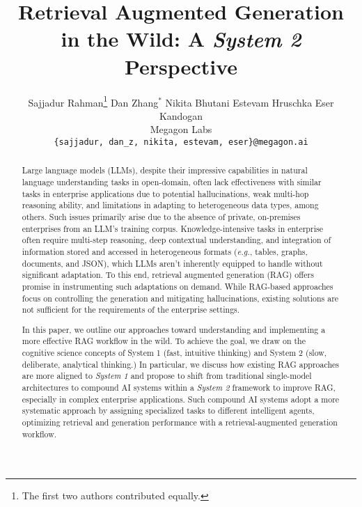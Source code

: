 \documentclass[11pt,dvipsnames]{article}
\newcommand{\eg}{{\itshape e.g.}, }
\begin{document}
\title{Retrieval Augmented Generation in the Wild: A \emph{System 2} Perspective}

\author{Sajjadur Rahman\footnote{The first two authors contributed equally.} \quad Dan Zhang$^*$ \quad Nikita Bhutani \quad Estevam Hruschka \quad Eser Kandogan\\
Megagon Labs\\
\texttt{\{sajjadur, dan\_z, nikita, estevam, eser\}@megagon.ai}
}

\maketitle

\begin{abstract}
Large language models (LLMs), despite their impressive capabilities in natural language understanding tasks in open-domain, often lack effectiveness with similar tasks in enterprise applications due to potential hallucinations, weak multi-hop reasoning ability, and limitations in adapting to heterogeneous data types, among others. Such issues primarily arise due to the absence of private, on-premises enterprises from an LLM's training corpus. Knowledge-intensive tasks in enterprise often require multi-step reasoning, deep contextual understanding, and integration of information stored and accessed in heterogeneous formats (\eg tables, graphs, documents, and JSON), which LLMs aren't inherently equipped to handle without significant adaptation.
To this end, retrieval augmented generation (RAG) offers promise in instrumenting such adaptations on demand. 
While RAG-based approaches focus on controlling the generation and mitigating hallucinations, existing solutions are not sufficient for the requirements of the enterprise settings. 

In this paper, we outline our approaches toward understanding and implementing a more effective RAG workflow in the wild. To achieve the goal, we draw on the cognitive science concepts of System 1 (fast, intuitive thinking) and System 2 (slow, deliberate, analytical thinking.) In particular, we discuss how existing RAG approaches are more aligned to \emph{System 1} and propose to shift from traditional single-model architectures to compound AI systems within a \emph{System 2} framework to improve RAG, especially in complex enterprise applications. 
Such compound AI systems adopt a more systematic approach by assigning specialized tasks to different intelligent agents, optimizing retrieval and generation performance with a retrieval-augmented generation workflow. 
\end{abstract}
\end{document}
